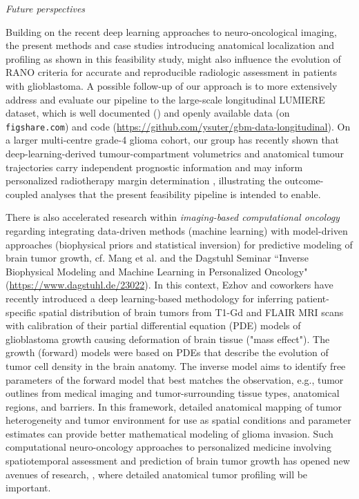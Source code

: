 \documentclass[a4paper,11pt,leqno]{article}
\begin{document}
\vspace{5mm}


\noindent \emph{Future perspectives}

\vspace{2mm}

Building on the recent deep learning approaches to neuro-oncological
imaging, the present methods and case studies introducing anatomical
localization and profiling as shown in this feasibility study, might also influence the evolution
of RANO criteria
\cite{Leao2020, Moon2021, Wen2010, Youssef2023}
for accurate and reproducible radiologic
assessment in patients with glioblastoma.
A possible follow-up of our approach is to more extensively address and evaluate our pipeline to
the large-scale longitudinal LUMIERE dataset,
which is well documented (\cite{Suter2022}) %
and openly available data (on {\small \texttt{figshare.com}})
and code ({\small \url{https://github.com/ysuter/gbm-data-longitudinal}}). On a larger multi-centre grade-4 glioma cohort, our group has recently shown that deep-learning-derived tumour-compartment volumetrics and anatomical tumour trajectories carry independent prognostic information and may inform personalized radiotherapy margin determination \cite{Hannisdal2026}, illustrating the outcome-coupled analyses that the present feasibility pipeline is intended to enable.

There is also accelerated research within \emph{imaging-based
computational oncology} regarding integrating data-driven methods
(machine learning) with model-driven approaches (biophysical priors and
statistical inversion) for predictive modeling of brain tumor growth,
cf. Mang et al. \cite{Mang2020} and the Dagstuhl
Seminar ``Inverse Biophysical Modeling and Machine Learning in
Personalized Oncology" ({\small \url{https://www.dagstuhl.de/23022}}). In this context,
Ezhov and coworkers \cite{Ezhov2023} %
have recently introduced a deep learning-based methodology for inferring
patient-specific spatial distribution of brain tumors from T1-Gd and
FLAIR MRI scans with calibration of their partial differential equation (PDE)
models of glioblastoma growth causing deformation  of
brain tissue ("mass effect").
The growth (forward) models were based on PDEs that describe the evolution of
tumor cell density
in the brain anatomy. The inverse model aims to identify free parameters
of the forward model that best matches the observation, e.g., tumor
outlines from medical imaging and tumor-surrounding tissue types,
anatomical regions, and barriers. In this framework, detailed anatomical mapping of tumor
heterogeneity and tumor environment for use as spatial conditions and
parameter estimates can provide better mathematical modeling of glioma
invasion. Such computational neuro-oncology approaches to personalized
medicine involving spatiotemporal assessment and prediction of brain
tumor growth has opened new avenues of research,
\cite{Alfonso2017,Ezhov2023, Hormuth2022, Lipkova2019, Lipkova2022, Scheufele2019},
where detailed anatomical tumor profiling will be important.
\end{document}
